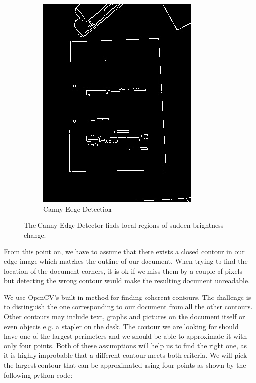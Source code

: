\documentclass[bibliography=totoc]{scrartcl}
\begin{document}
\begin{figure}[ht!]
\begin{subfigure}[t]{0.28\linewidth}
		\includegraphics[width=\linewidth]{imgs/edges/cluttered_desk.jpg}
		\caption{Canny Edge Detection}
		\label{subfig:edges}
	\end{subfigure}
	\caption{The Canny Edge Detector finds local regions of sudden brightness change.}
\end{figure}

From this point on, we have to assume that there exists a closed contour in our edge image which matches the outline of our document.
When trying to find the location of the document corners, it is ok if we miss them by a couple of pixels but detecting the wrong contour would make the resulting document unreadable.

We use OpenCV's built-in method for finding coherent contours.
The challenge is to distinguish the one corresponding to our document from all the other contours.
Other contours may include text, graphs and pictures on the document itself or even objects e.g. a stapler on the desk.
The contour we are looking for should have one of the largest perimeters and we should be able to approximate it with only four points.
Both of these assumptions will help us to find the right one, as it is highly improbable that a different contour meets both criteria. 
We will pick the largest contour that can be approximated using four points as shown by the following python code: \\
\end{document}
